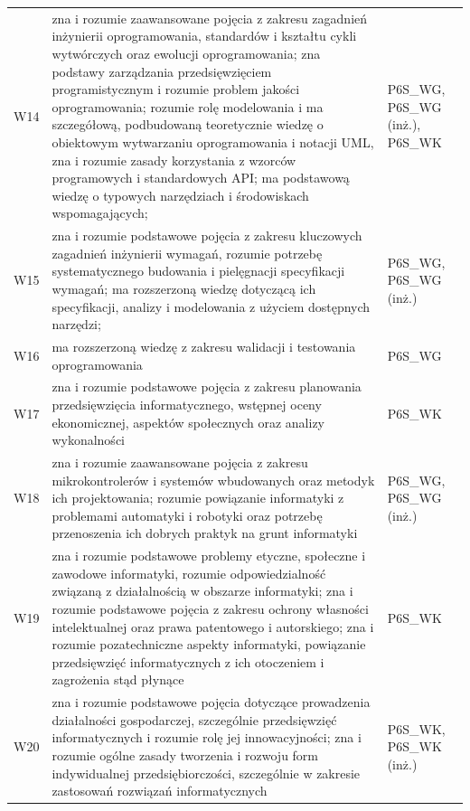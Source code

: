 \documentclass[12pt,a4paper]{article}
\begin{document}
{\begin{longtable}{m{1cm}m{9.5cm}m{3.9cm}}
\rowcolor{tableRowAlt} W14 & zna i rozumie zaawansowane pojęcia z zakresu zagadnień inżynierii oprogramowania, standardów i kształtu cykli wytwórczych oraz ewolucji oprogramowania; zna podstawy zarządzania przedsięwzięciem programistycznym i rozumie problem jakości oprogramowania; rozumie rolę modelowania i ma szczegółową, podbudowaną teoretycznie wiedzę o obiektowym  wytwarzaniu oprogramowania i notacji UML, zna i rozumie zasady korzystania z wzorców programowych i standardowych API; ma podstawową wiedzę o typowych narzędziach i środowiskach wspomagających; & {\scriptsize P6S\_WG, P6S\_WG {\scriptsize (inż.)}, P6S\_WK} \\
\rowcolor{tableRowLight} W15 & zna i rozumie podstawowe pojęcia z zakresu kluczowych zagadnień inżynierii wymagań, rozumie potrzebę systematycznego budowania i pielęgnacji specyfikacji wymagań; ma rozszerzoną wiedzę dotyczącą  ich specyfikacji, analizy i modelowania z użyciem dostępnych narzędzi; & {\scriptsize P6S\_WG, P6S\_WG {\scriptsize (inż.)}} \\
\rowcolor{tableRowAlt} W16 & ma rozszerzoną wiedzę z zakresu walidacji i testowania oprogramowania & {\scriptsize P6S\_WG} \\
\rowcolor{tableRowLight} W17 & zna i rozumie podstawowe pojęcia z zakresu planowania przedsięwzięcia informatycznego, wstępnej oceny ekonomicznej, aspektów społecznych oraz analizy wykonalności & {\scriptsize P6S\_WK} \\
\rowcolor{tableRowAlt} W18 & zna i rozumie zaawansowane pojęcia z zakresu mikrokontrolerów i systemów wbudowanych oraz metodyk ich projektowania; rozumie powiązanie informatyki z problemami automatyki i robotyki oraz potrzebę przenoszenia ich dobrych praktyk na grunt informatyki & {\scriptsize P6S\_WG, P6S\_WG {\scriptsize (inż.)}} \\
\rowcolor{tableRowLight} W19 & zna i rozumie podstawowe problemy etyczne, społeczne i zawodowe informatyki, rozumie odpowiedzialność związaną z działalnością w obszarze informatyki; zna i rozumie podstawowe pojęcia z zakresu ochrony własności intelektualnej oraz prawa patentowego i autorskiego; zna i rozumie pozatechniczne aspekty informatyki, powiązanie przedsięwzięć informatycznych z ich otoczeniem i zagrożenia stąd płynące & {\scriptsize P6S\_WK} \\
\rowcolor{tableRowAlt} W20 & zna i rozumie podstawowe pojęcia dotyczące prowadzenia działalności gospodarczej, szczególnie przedsięwzięć informatycznych i rozumie rolę jej innowacyjności; zna i rozumie ogólne zasady tworzenia i rozwoju form indywidualnej przedsiębiorczości, szczególnie w zakresie zastosowań rozwiązań informatycznych & {\scriptsize P6S\_WK, P6S\_WK {\scriptsize (inż.)}} \\

\end{longtable}}
\end{document}
